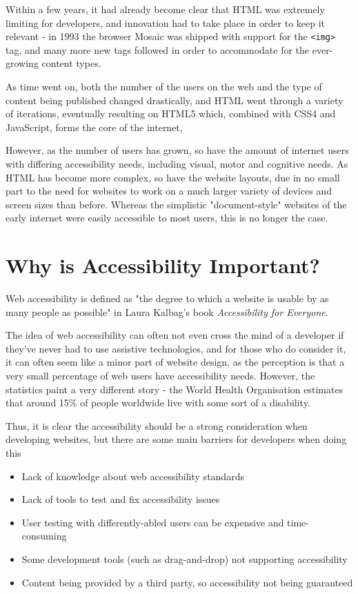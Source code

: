 \documentclass[ %
                    author={Aleena Baig},
                supervisor={Dr Simon Lock},
                    degree={BSc},
                     title={On Making Web Accessible Graphs},
                  subtitle={},
                      year={2019} ]{dissertation}
\begin{document}
Within a few years, it had already become clear that HTML was extremely limiting for developers, and innovation had to take place in order to keep it relevant - in 1993 the browser Mosaic was shipped with support for the \texttt{<img>} tag, and many more new tags followed in order to accommodate for the ever-growing content types. \cite{historyofhtml}

As time went on, both the number of the users on the web and the type of content being published changed drastically, and HTML went through a variety of iterations, eventually resulting on HTML5 which, combined with CSS4 and JavaScript, forms the core of the internet,

However, as the number of users has grown, so have the amount of internet users with differing accessibility needs, including visual, motor and cognitive needs. As HTML has become more complex, so have the website layouts, due in no small part to the need for websites to work on a much larger variety of devices and screen sizes than before. Whereas the simplistic "document-style" websites of the early internet were easily accessible to most users, this is no longer the case.


\section{Why is Accessibility Important?}

Web accessibility is defined as "the degree to which a
website is usable by as many people as possible" in Laura Kalbag's book \textit{Accessibility for Everyone}. \cite{accessibilityforeveryone}

The idea of web accessibility can often not even cross the mind of a developer if they've never had to use assistive technologies, and for those who do consider it, it can often seem like a minor part of website design, as the perception is that a very small percentage of web users have accessibility needs.
However, the statistics paint a very different story - the World Health Organisation estimates that around 15\% of people worldwide live with some sort of a disability. \cite{WHOdisability}

Thus, it is clear the accessibility should be a strong consideration when developing websites, but there are some main barriers for developers when doing this

\begin{itemize}
    \item Lack of knowledge about web accessibility standards
    \item Lack of tools to test and fix accessibility issues
    \item User testing with differently-abled users can be expensive and time-consuming
    \item Some development tools (such as drag-and-drop) not supporting accessibility
    \item Content being provided by a third party, so accessibility not being guaranteed
\end{itemize}
\end{document}

